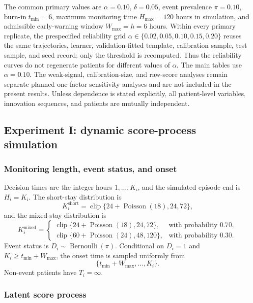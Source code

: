 \documentclass[11pt]{article}
\newcommand{\clip}{\operatorname{clip}}
\begin{document}
The common primary values are $\alpha=0.10$, $\delta=0.05$, event prevalence $\pi=0.10$, burn-in $t_{\min}=6$, maximum monitoring time $H_{\max}=120$ hours in simulation, and admissible early-warning window $W_{\max}=h=6$ hours. Within every primary replicate, the prespecified reliability grid $\alpha\in\{0.02,0.05,0.10,0.15,0.20\}$ reuses the same trajectories, learner, validation-fitted template, calibration sample, test sample, and seed record; only the threshold is recomputed. Thus the reliability curves do not regenerate patients for different values of $\alpha$. The main tables use $\alpha=0.10$. The weak-signal, calibration-size, and raw-score analyses remain separate planned one-factor sensitivity analyses and are not included in the present results. Unless dependence is stated explicitly, all patient-level variables, innovation sequences, and patients are mutually independent.

\subsection{Experiment I: dynamic score-process simulation}\label{subsec:sim-score}

\subsubsection{Monitoring length, event status, and onset}

Decision times are the integer hours $1,\ldots,K_i$, and the simulated episode end is $H_i=K_i$. The short-stay distribution is
\begin{equation}
K_i^{\mathrm{short}}=
\clip\{24+\operatorname{Poisson}(18),24,72\},
\label{eq:short-stay}
\end{equation}
and the mixed-stay distribution is
\begin{equation}
K_i^{\mathrm{mixed}}=
\begin{cases}
\clip\{24+\operatorname{Poisson}(18),24,72\},&\text{with probability }0.70,\\
\clip\{60+\operatorname{Poisson}(24),48,120\},&\text{with probability }0.30.
\end{cases}
\label{eq:mixed-stay}
\end{equation}
Event status is $D_i\sim\operatorname{Bernoulli}(\pi)$. Conditional on $D_i=1$ and $K_i\ge t_{\min}+W_{\max}$, the onset time is sampled uniformly from
\[
\{t_{\min}+W_{\max},\ldots,K_i\}.
\]
Non-event patients have $T_i=\infty$.

\subsubsection{Latent score process}
\end{document}
